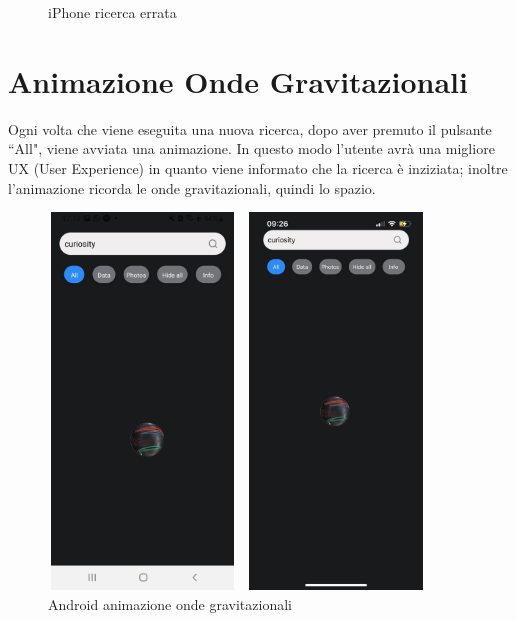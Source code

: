 \begin{figure}[h]
\begin{minipage}[h]{0.47\textwidth}
        \caption{\label{ricercaErrataIphone} iPhone ricerca errata}
    \end{minipage}
\end{figure}

\section*{Animazione Onde Gravitazionali}
Ogni volta che viene eseguita una nuova ricerca, dopo aver premuto il pulsante ``All", viene avviata una animazione. In questo modo l'utente avr\`a una migliore UX (User Experience) in quanto viene informato che la ricerca \`e inziziata; inoltre l'animazione ricorda le onde gravitazionali, quindi lo spazio.
\begin{figure}[H]
    \begin{minipage}[h]{0.47\textwidth}
        \centering
        \includegraphics[width=5cm, height=10cm]{images/immaginiAndroid/animazione.jpg}
        \caption{\label{animazioneAndroid} Android animazione onde gravitazionali}
    \end{minipage}
    \hfill
    \begin{minipage}[h]{0.47\textwidth}
        \centering
        \includegraphics[width=5cm, height=10cm]{images/immaginiPhone/animazione.jpeg}

\end{minipage}
\end{figure}
